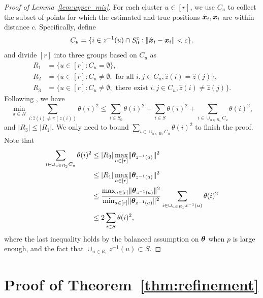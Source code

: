 \documentclass[lettersize,onecolumn,journal]{IEEEtran}
\theoremstyle{definition}
\theoremstyle{definition}
\begin{document}
\begin{proof}[Proof of Lemma~\ref{lem:upper_mis}] 

For each cluster $u\in[r]$, we use $C_u$ to collect the subset of points for which the estimated and true positions $\hat {\bm x}_i, \bm x_i$ are within distance $c$. Specifically, define
\begin{equation}
    C_u = \{ i \in z^{-1}(u) \cap S_0^c: \lVert\hat {\bm x}_i - \bm x_i\rVert < c \},
\end{equation}
and divide $[r]$ into three groups based on $C_u$ as 
\begin{align}
    R_1 &= \{ u \in [r]: C_u = \emptyset \},\\
    R_2 &= \{ u \in [r]: C_u \neq \emptyset, \text{ for all } i, j \in C_u, \hat z(i) = \hat z(j) \},\\
    R_3 &= \{ u \in [r]: C_u \neq \emptyset, \text{ there exist } i, j \in C_u, \hat z(i) \neq \hat z(j) \}.
\end{align}
Following \citet[Lemma 6]{gao2018community}, we have 
\begin{equation}
    \min_{\pi \in \Pi} \sum_{i : \hat z(i) \neq \pi(z(i))} \theta(i)^2 \leq \sum_{i \in S_0} \theta(i)^2 + \sum_{i \in S} \theta(i)^2 + \sum_{ i \in \cup_{u \in R_3} C_u} \theta(i)^2,
\end{equation}
and $|R_3| \leq |R_1|$. We only need to bound $\sum_{ i \in \cup_{u \in R_3} C_u} \theta(i)^2$ to finish the proof. Note that 
\begin{align}
    \sum_{ i \in \cup_{u \in R_3} C_u} \theta(i)^2 &\leq |R_3| \max_{a \in [r]} \lVert\boldsymbol{\theta}_{z^{-1}(a)}\rVert^2 \\
    & \leq |R_1| \max_{a \in [r]} \lVert\boldsymbol{\theta}_{z^{-1}(a)}\rVert^2  \\
    & \leq {\max_{a \in [r]} \lVert\boldsymbol{\theta}_{z^{-1}(a)}\rVert^2 \over \min_{a \in [r]} \lVert\boldsymbol{\theta}_{z^{-1}(a)}\rVert^2 } \sum_{i \in \cup_{u \in R_1} z^{-1}(u)} \theta(i)^2\\
    & \leq 2 \sum_{i \in S} \theta(i)^2,
\end{align}
where the last inequality holds by the balanced assumption on $\boldsymbol{\theta}$ when $p$ is large enough, and the fact that $ \cup_{u \in R_1} z^{-1}(u) \subset S$.
\end{proof}

\newpage

\section*{Proof of Theorem~\ref{thm:refinement}}
\end{document}
